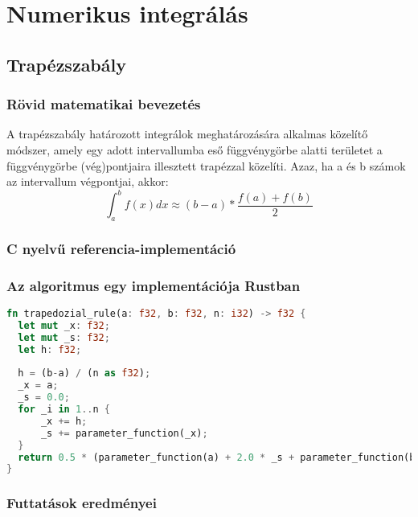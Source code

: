 

\section{Numerikus integrálás}

\subsection{Trapézszabály}
\subsubsection{Rövid matematikai bevezetés}
A trapézszabály határozott integrálok meghatározására alkalmas közelítő módszer, amely egy adott intervallumba eső függvénygörbe alatti területet a függvénygörbe (vég)pontjaira illesztett trapézzal közelíti. Azaz, ha a és b számok az intervallum végpontjai, akkor:
\[ \int_{a}^{b} f(x) dx \approx (b-a) * \frac{f(a) + f(b)}{2} \]
\subsubsection{C nyelvű referencia-implementáció}
\begin{cppstyle}
\end{cppstyle}
\subsubsection{Az algoritmus egy implementációja Rustban}
\begin{lstlisting}[language=Rust, style=boxed]
fn trapedozial_rule(a: f32, b: f32, n: i32) -> f32 {
  let mut _x: f32;
  let mut _s: f32;
  let h: f32;
  
  h = (b-a) / (n as f32);
  _x = a;
  _s = 0.0;
  for _i in 1..n {
	  _x += h;
	  _s += parameter_function(_x);
  }
  return 0.5 * (parameter_function(a) + 2.0 * _s + parameter_function(b) );
}
\end{lstlisting}

\subsubsection{Futtatások eredményei} %

